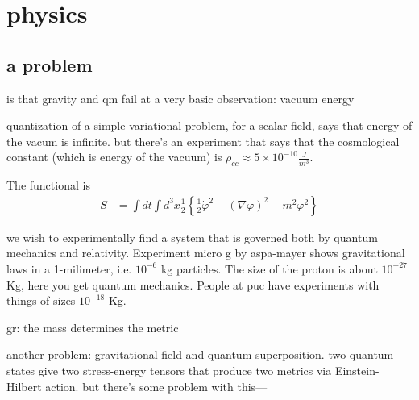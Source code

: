 \chapter{physics}

\section{a problem}
is that gravity and qm fail at a very basic observation: vacuum energy

quantization of a simple variational problem, for a scalar field, says that energy of the vacum is infinite. but there's an experiment that says that the cosmological constant (which is energy of the vacuum) is \(\rho_{cc}\approx 5 \times 10 ^{-10}\frac{J}{m^3}\).

The functional is
\begin{align*}
S&=\int dt \int d^3x \frac{1}{2}\left\{ \frac{1}{2}\dot\varphi^2-(\nabla \varphi)^2-m^2\varphi^2\right\} 
\end{align*}

we wish to experimentally find a system that is governed both by quantum mechanics and relativity. Experiment micro g by aspa-mayer shows gravitational laws in a 1-milimeter, i.e. \(10^{-6}\) kg particles. The size of the proton is about \(10^{-27}\) Kg, here you get quantum mechanics. People at puc have experiments with things of sizes \(10^{-18}\) Kg.

gr: the mass determines the metric


another problem: gravitational field and quantum superposition. two quantum states give two stress-energy tensors that produce two metrics via Einstein-Hilbert action. but there's some problem with this---



